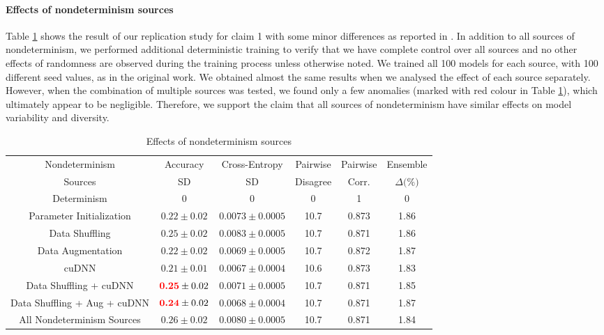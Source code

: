 \paragraph{Effects of nondeterminism sources}
Table \ref{table:table4} shows the result of our replication study for  claim 1 with some minor differences as reported in \citep{summers2021nondeterminism}. In addition to all sources of nondeterminism, we performed additional deterministic training to verify that we have complete control over all sources and no other effects of randomness are observed during the training process unless otherwise noted. We trained all 100 models for each source, with 100 different seed values, as in the original work. We obtained almost the same results when we analysed the effect of each source separately. However, when the combination of multiple sources was tested, we found only a few anomalies (marked with red colour in Table \ref{table:table4}), which ultimately appear to be negligible. Therefore, we support the claim that all sources of nondeterminism have similar effects on model variability and diversity.
\begin{table}[!hb]
\centering
	\begin{tabular}{c|c|c|c|c|c}
	\hline
    Nondeterminism  & Accuracy & Cross-Entropy & Pairwise  & Pairwise & Ensemble \\
    Sources & SD \text{(\%)} & SD \text{(\%)} & Disagree \text{(\%)} & Corr. & $\Delta \text{(\%)}$\\
	\hline
		Determinism  & 0 & 0 & 0 & 1 & 0 \\
		Parameter Initialization & $0.22 \pm 0.02$  & $0.0073 \pm 0.0005$  &  10.7 & 0.873 & 1.86  \\
	    Data Shuffling & $0.25 \pm 0.02$ & $0.0083 \pm 0.0005$  &  10.7 & 0.871 & 1.86   \\
	    Data Augmentation & $0.22 \pm 0.02$ & $0.0069 \pm 0.0005$  &  10.7 & 0.872 & 1.87  \\
	    cuDNN & $0.21 \pm 0.01$ & $0.0067 \pm 0.0004$  &  10.6 & 0.873 & 1.83  \\
	    Data Shuffling + cuDNN & $\textbf{\textcolor{red}{0.25}} \pm 0.02$ & $0.0071 \pm 0.0005$  &  10.7 & 0.871 & 1.85 \\
	    Data Shuffling + Aug + cuDNN & $\textbf{\textcolor{red}{0.24}} \pm 0.02$ & $0.0068 \pm 0.0004$  &  10.7 & 0.871 & 1.87  \\
	    All Nondeterminism Sources & $0.26 \pm 0.02$ & $0.0080 \pm 0.0005$  &  10.7 & 0.871 & 1.84  \\
		\hline
	\end{tabular}
	\caption{Effects of nondeterminism sources}
	\label{table:table4}
\end{table}

